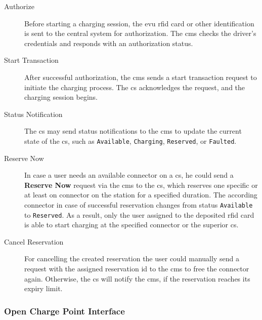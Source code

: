 \begin{description}
    \item[Authorize] Before starting a charging session, the \acrshort{evu} \acrfull{rfid} card or other identification is sent to the central system for authorization. The \acrshort{cms} checks the driver's credentials and responds with an authorization status.
    \item[Start Transaction] After successful authorization, the \acrshort{cms} sends a start transaction request to initiate the charging process. The \acrshort{cs} acknowledges the request, and the charging session begins.
    \item[Status Notification] The \acrshort{cs} may send status notifications to the \acrshort{cms} to update the current state of the \acrshort{cs}, such as \verb|Available|, \verb|Charging|, \verb|Reserved|, or \verb|Faulted|.
    \item[Reserve Now] In case a user needs an available connector on a \acrshort{cs}, he could send a \textbf{Reserve Now} request via the \acrshort{cms} to the \acrshort{cs}, which reserves one specific or at least on connector on the station for a specified duration. The according connector in case of successful reservation changes from status \verb|Available| to \verb|Reserved|.
    As a result, only the user assigned to the deposited \acrshort{rfid} card is able to start charging at the specified connector or the superior \acrshort{cs}.
    \item[Cancel Reservation] For cancelling the created reservation the user could manually send a request with the assigned reservation id to the \acrshort{cms} to free the connector again. Otherwise, the \acrshort{cs} will notify the \acrshort{cms}, if the reservation reaches its expiry limit.
\end{description}

\subsubsection{Open Charge Point Interface}
\label{ch:Fundamentals:sec:Electric Mobility:ssec:Relevant Standards:sssec:OCPI}


